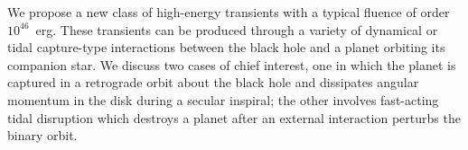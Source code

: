 We propose a new class of high-energy transients with a typical
  fluence of order $10^{46}$~erg.  These transients can be produced
  through a variety of dynamical or tidal capture-type interactions
  between the black hole and a planet orbiting its companion star.  We
  discuss two cases of chief interest, one in which the planet is
  captured in a retrograde orbit about the black hole and dissipates
  angular momentum in the disk during a secular inspiral; the other
  involves fast-acting tidal disruption which destroys a planet after
  an external interaction perturbs the binary orbit.